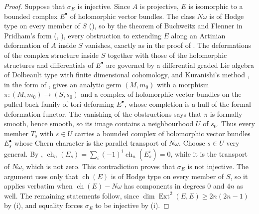 \documentclass[11pt,reqno]{amsart}
\theoremstyle{plain}
\theoremstyle{definition}
\theoremstyle{remark}
\DeclareMathOperator{\ch}{ch}
\DeclareMathOperator{\Ext}{Ext}
\begin{document}
\begin{proof}
Suppose that $\sigma_{E}$ is injective. Since $A$ is projective, $E$ is isomorphic to
a bounded complex $E^{\bullet}$ of holomorphic vector bundles. The class
$N\omega$ is of Hodge type on every member of $S$ (), so
by the theorem of Buchweitz and Flenner in Pridham's form (,
\cite{BF03,Pri24}), every obstruction to extending $E$ along an
Artinian deformation of $A$ inside $S$ vanishes, exactly as in the proof of
. The deformations of the complex structure inside
$S$ together with those of the holomorphic structures and differentials of
$E^{\bullet}$ are governed by a differential graded Lie algebra of Dolbeault
type with finite dimensional cohomology, and Kuranishi's method
\cite{Kur65}, in the form of \cite[Sections~2--3]{GM88}, gives an analytic
germ $(M,m_{0})$ with a morphism $\pi\colon(M,m_{0})\to(S,s_{0})$ and a
complex of holomorphic vector bundles on the pulled back family of tori
deforming $E^{\bullet}$, whose completion is a hull of the formal deformation
functor. The vanishing of the obstructions says that $\pi$ is formally
smooth, hence smooth, so its image contains a neighbourhood $U$ of $s_{0}$.
Thus every member $T_{s}$ with $s\in U$ carries a bounded complex of
holomorphic vector bundles $E_{s}^{\bullet}$ whose Chern character is the
parallel transport of $N\omega$. Choose $s\in U$ very general. By
,
$\ch_{n}(E_{s})=\sum_{i}(-1)^{i}\ch_{n}(E_{s}^{i})=0$, while it is the
transport of $N\omega$, which is not zero. This contradiction proves that
$\sigma_{E}$ is not injective. The argument uses only that $\ch(E)$ is of
Hodge type on every member of $S$, so it applies verbatim when $\ch(E)-N\omega$
has components in degrees $0$ and $4n$ as well. The remaining statements
follow, since $\dim\Ext^{2}(E,E)\ge2n(2n-1)$ by (i),
and equality forces $\sigma_{E}$ to be injective by
(i).
\end{proof}
\end{document}
